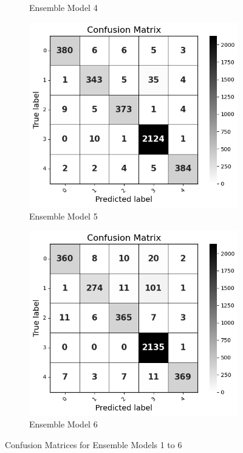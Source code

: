 \begin{figure}[H]
\begin{subfigure}[b]{0.49\textwidth}
        \caption{Ensemble Model 4}
        \label{bag cm}  %
    \end{subfigure}
    \hfill
    \begin{subfigure}[b]{0.49\textwidth}
        \centering
        \includegraphics[width=\textwidth]{Images/BLD CM.png}
        \caption{Ensemble Model 5}
        \label{bld cm}  %
    \end{subfigure}
    \hfill
    \begin{subfigure}[b]{0.49\textwidth}
        \centering
        \includegraphics[width=\textwidth]{Images/WV CM.png}
        \caption{Ensemble Model 6}
        \label{wv cm}  %
    \end{subfigure}
    \label{fig:ensemble_model_comparison}
    \caption{Confusion Matrices for Ensemble Models 1 to 6}
\end{figure}

